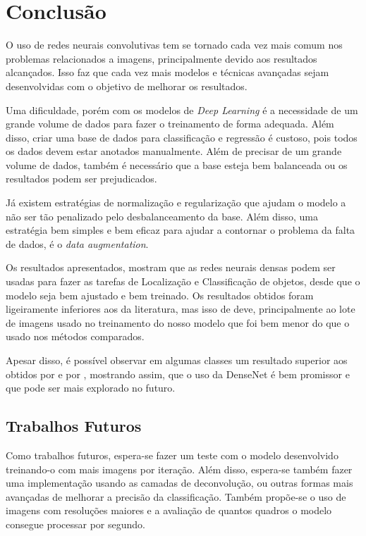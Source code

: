\chapter{Conclusão}
\label{cap:6}
\vspace{-1.9cm}

O uso de redes neurais convolutivas tem se tornado cada vez mais comum nos problemas relacionados a imagens, principalmente devido aos resultados alcançados. Isso faz que cada vez mais modelos e técnicas avançadas sejam desenvolvidas com o objetivo de melhorar os resultados.

Uma dificuldade, porém com os modelos de \textit{Deep Learning} é a necessidade de um grande volume de dados para fazer o treinamento de forma adequada. Além disso, criar uma base de dados para classificação e regressão é custoso, pois todos os dados devem estar anotados manualmente. Além de precisar de um grande volume de dados, também é necessário que a base esteja bem balanceada ou os resultados podem ser prejudicados.

Já existem estratégias de normalização e regularização que ajudam o modelo a não ser tão penalizado pelo desbalanceamento da base. Além disso, uma estratégia bem simples e bem eficaz para ajudar a contornar o problema da falta de dados, é o \textit{data augmentation}.

Os resultados apresentados, mostram que as redes neurais densas podem ser usadas para fazer as tarefas de Localização e Classificação de objetos, desde que o modelo seja bem ajustado e bem treinado. Os resultados obtidos foram ligeiramente inferiores aos da literatura, mas isso de deve, principalmente ao lote de imagens usado no treinamento do nosso modelo que foi bem menor do que o usado nos métodos comparados.

Apesar disso, é possível observar em algumas classes um resultado superior aos obtidos por  e por , mostrando assim, que o uso da \ac{DenseNet} é bem promissor e que pode ser mais explorado no futuro.

\section{Trabalhos Futuros}

Como trabalhos futuros, espera-se fazer um teste com o modelo desenvolvido treinando-o com mais imagens por iteração. Além disso, espera-se também fazer uma implementação usando as camadas de deconvolução, ou outras formas mais avançadas de melhorar a precisão da classificação. Também propõe-se o uso de imagens com resoluções maiores e a avaliação de quantos quadros o modelo consegue processar por segundo.
